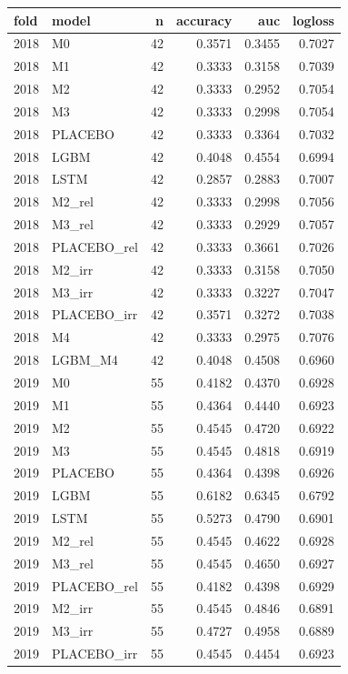 \begin{tabular}{llrrrr}
\toprule
fold & model & n & accuracy & auc & logloss \\
\midrule
2018 & M0 & 42 & 0.3571 & 0.3455 & 0.7027 \\
2018 & M1 & 42 & 0.3333 & 0.3158 & 0.7039 \\
2018 & M2 & 42 & 0.3333 & 0.2952 & 0.7054 \\
2018 & M3 & 42 & 0.3333 & 0.2998 & 0.7054 \\
2018 & PLACEBO & 42 & 0.3333 & 0.3364 & 0.7032 \\
2018 & LGBM & 42 & 0.4048 & 0.4554 & 0.6994 \\
2018 & LSTM & 42 & 0.2857 & 0.2883 & 0.7007 \\
2018 & M2\_rel & 42 & 0.3333 & 0.2998 & 0.7056 \\
2018 & M3\_rel & 42 & 0.3333 & 0.2929 & 0.7057 \\
2018 & PLACEBO\_rel & 42 & 0.3333 & 0.3661 & 0.7026 \\
2018 & M2\_irr & 42 & 0.3333 & 0.3158 & 0.7050 \\
2018 & M3\_irr & 42 & 0.3333 & 0.3227 & 0.7047 \\
2018 & PLACEBO\_irr & 42 & 0.3571 & 0.3272 & 0.7038 \\
2018 & M4 & 42 & 0.3333 & 0.2975 & 0.7076 \\
2018 & LGBM\_M4 & 42 & 0.4048 & 0.4508 & 0.6960 \\
2019 & M0 & 55 & 0.4182 & 0.4370 & 0.6928 \\
2019 & M1 & 55 & 0.4364 & 0.4440 & 0.6923 \\
2019 & M2 & 55 & 0.4545 & 0.4720 & 0.6922 \\
2019 & M3 & 55 & 0.4545 & 0.4818 & 0.6919 \\
2019 & PLACEBO & 55 & 0.4364 & 0.4398 & 0.6926 \\
2019 & LGBM & 55 & 0.6182 & 0.6345 & 0.6792 \\
2019 & LSTM & 55 & 0.5273 & 0.4790 & 0.6901 \\
2019 & M2\_rel & 55 & 0.4545 & 0.4622 & 0.6928 \\
2019 & M3\_rel & 55 & 0.4545 & 0.4650 & 0.6927 \\
2019 & PLACEBO\_rel & 55 & 0.4182 & 0.4398 & 0.6929 \\
2019 & M2\_irr & 55 & 0.4545 & 0.4846 & 0.6891 \\
2019 & M3\_irr & 55 & 0.4727 & 0.4958 & 0.6889 \\
2019 & PLACEBO\_irr & 55 & 0.4545 & 0.4454 & 0.6923 \\

\end{tabular}
